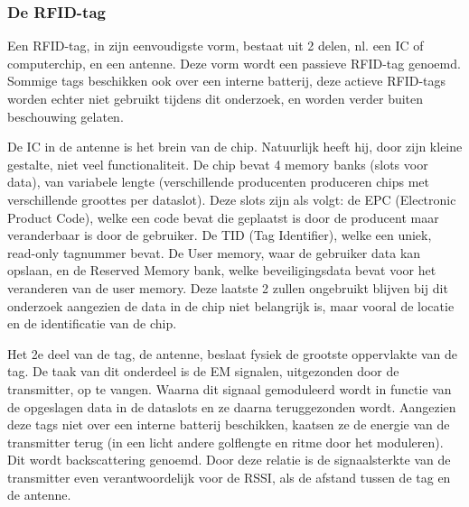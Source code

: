 \subsubsection{De RFID-tag}
Een RFID-tag, in zijn eenvoudigste vorm, bestaat uit 2 delen, nl. een IC of computerchip, en een antenne. Deze vorm wordt een passieve RFID-tag genoemd. Sommige tags beschikken ook over een interne batterij, deze actieve RFID-tags worden echter niet gebruikt tijdens dit onderzoek, en worden verder buiten beschouwing gelaten.\autocite{atlasrfidstore2022} 

De IC in de antenne is het brein van de chip. Natuurlijk heeft hij, door zijn kleine gestalte, niet veel functionaliteit. De chip bevat 4 memory banks (slots voor data), van variabele lengte (verschillende producenten produceren chips met verschillende groottes per dataslot). Deze slots zijn als volgt: de EPC (Electronic Product Code), welke een code bevat die geplaatst is door de producent maar veranderbaar is door de gebruiker. De TID (Tag Identifier), welke een uniek, read-only tagnummer bevat. De User memory, waar de gebruiker data kan opslaan, en de Reserved Memory bank, welke beveiligingsdata bevat voor het veranderen van de user memory.\autocite{Smiley2017} Deze laatste 2 zullen ongebruikt blijven bij dit onderzoek aangezien de data in de chip niet belangrijk is, maar vooral de locatie en de identificatie van de chip.

Het 2e deel van de tag, de antenne, beslaat fysiek de grootste oppervlakte van de tag. De taak van dit onderdeel is de EM signalen, uitgezonden door de transmitter, op te vangen. Waarna dit signaal gemoduleerd wordt in functie van de opgeslagen data in de dataslots en ze daarna teruggezonden wordt. Aangezien deze tags niet over een interne batterij beschikken, kaatsen ze de energie van de transmitter terug (in een licht andere golflengte en ritme door het moduleren). Dit wordt backscattering genoemd. Door deze relatie is de signaalsterkte van de transmitter even verantwoordelijk voor de RSSI, als de afstand tussen de tag en de antenne.\autocite{atlasrfidstore2022a}

